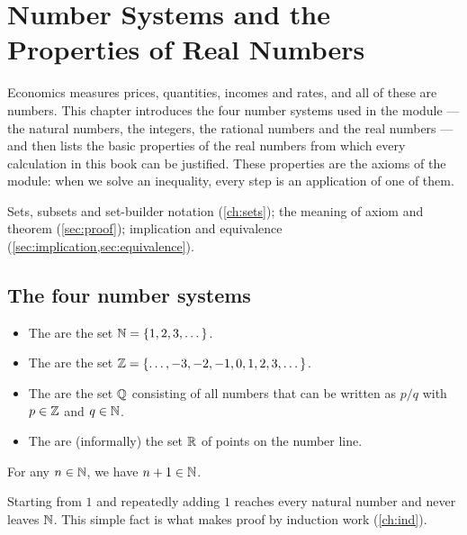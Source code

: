 \chapter{Number Systems and the Properties of Real Numbers}\label{ch:numbers}

\begin{chapterintro}
Economics measures prices, quantities, incomes and rates, and all of these are numbers. This chapter
introduces the four number systems used in the module --- the natural numbers, the integers, the rational
numbers and the real numbers --- and then lists the basic properties of the real numbers from which every
calculation in this book can be justified. These properties are the axioms of the module: when we solve an
inequality, every step is an application of one of them.
\end{chapterintro}

\begin{prerequisites}
Sets, subsets and set-builder notation (\cref{ch:sets}); the meaning of axiom and theorem
(\cref{sec:proof}); implication and equivalence (\cref{sec:implication,sec:equivalence}).
\end{prerequisites}

\section{The four number systems}\label{sec:number-systems}

\begin{definition}
\begin{itemize}
  \item The  are the set $\mathbb{N}=\{1,2,3,\dots\}$.
  \item The  are the set $\mathbb{Z}=\{\dots,-3,-2,-1,0,1,2,3,\dots\}$.
  \item The  are the set $\mathbb{Q}$ consisting of all numbers that can be written as $p/q$
  with $p\in\mathbb{Z}$ and $q\in\mathbb{N}$.
  \item The  are (informally) the set $\mathbb{R}$ of points on the number line.
\end{itemize}
\end{definition}

\begin{core}
For any $n\in\mathbb{N}$, we have $n+1\in\mathbb{N}$. 

Starting from $1$ and repeatedly adding $1$ reaches every natural number and never leaves $\mathbb{N}$. This simple
fact is what makes proof by induction work (\cref{ch:ind}).
\end{core}

